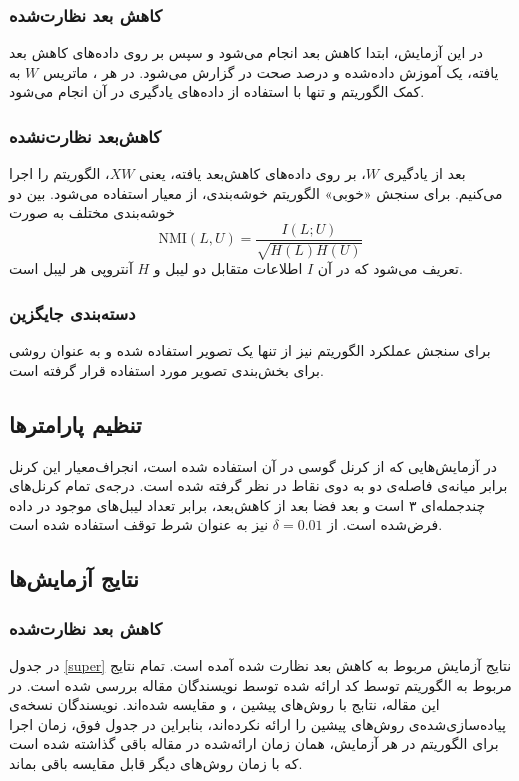 \subsubsection{کاهش بعد نظارت‌شده}
در این آزمایش، ابتدا کاهش بعد انجام می‌شود و سپس بر روی داده‌های کاهش بعد یافته، یک 
آموزش داده‌شده و درصد صحت در 
گزارش می‌شود. در هر
،
ماتریس 
$W$
به کمک الگوریتم 
و تنها با استفاده از داده‌های یادگیری در آن 
انجام می‌شود.
\subsubsection{کاهش‌بعد نظارت‌نشده}
بعد از یادگیری
$W$،
بر روی داده‌های کاهش‌بعد یافته، یعنی 
$XW$،
الگوریتم 
را اجرا می‌کنیم. برای سنجش «خوبی» الگوریتم خوشه‌بندی، از معیار 
استفاده می‌شود.
بین دو خوشه‌بندی مختلف به صورت
\begin{equation}
\mathrm{NMI}(L, U)  =\frac{I(L; U)}{\sqrt{H(L)H(U)}}
\end{equation}
تعریف می‌شود که در آن 
 $I$
 اطلاعات متقابل دو لیبل و 
 $H$
 آنتروپی هر لیبل  است.
 
\subsubsection{
	دسته‌بندی جایگزین
}
برای سنجش عملکرد الگوریتم نیز از تنها یک تصویر استفاده شده و 
به عنوان روشی برای بخش‌بندی تصویر مورد استفاده قرار گرفته است.

\subsection{تنظیم پارامتر‌ها}
در آزمایش‌هایی که از کرنل گوسی در آن استفاده شده است، انجراف‌معیار این کرنل برابر میانه‌ی فاصله‌ی دو به دوی نقاط در نظر گرفته شده است. درجه‌ی تمام کرنل‌های چندجمله‌ای ۳ است و بعد فضا بعد از کاهش‌بعد، برابر تعداد لیبل‌های موجود در داده فرض‌شده است. از 
$\delta = 0.01$
نیز به عنوان شرط توقف
استفاده شده است.
\subsection{نتایج آزمایش‌ها}
\subsubsection{کاهش‌ بعد نظارت‌شده}
در جدول 
\eqref{super}
 نتایج آزمایش مربوط به کاهش  بعد نظارت شده آمده است. تمام نتایج مربوط به الگوریتم 
توسط کد ارائه شده توسط نویسندگان مقاله بررسی شده است.  در این مقاله، نتابج
با روش‌های پیشین 
،
و 
مقایسه‌ شده‌اند. نویسندگان نسخه‌ی پیاده‌سازی‌شده‌ی روش‌های پیشین را ارائه نکرده‌اند، بنابراین در جدول فوق، زمان اجرا برای الگوریتم 
در هر آزمایش، همان زمان ارائه‌شده در مقاله باقی گذاشته شده است که با زمان روش‌های دیگر قابل مقایسه باقی‌ بماند.  

